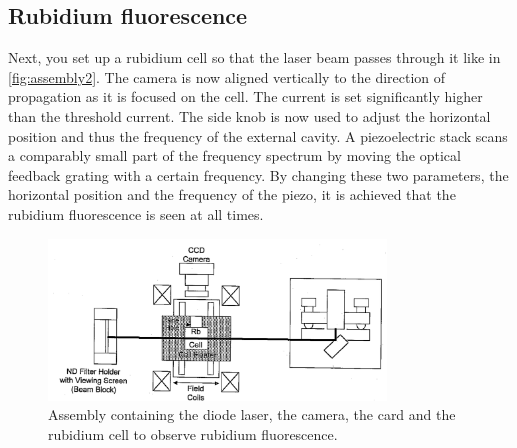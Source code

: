 \FloatBarrier

\subsection{Rubidium fluorescence}
Next, you set up a rubidium cell so that the laser beam passes through it like in \autoref{fig:assembly2}.
The camera is now aligned vertically to the direction of propagation as it is focused on the cell.
The current is set significantly higher than the threshold current.
The side knob is now used to adjust the horizontal position and thus the frequency of the external cavity.
A piezoelectric stack scans a comparably small part of the frequency spectrum by moving the optical feedback grating with a certain frequency.
By changing these two parameters, the horizontal position and the frequency of the piezo, it is achieved that the rubidium fluorescence is seen at all times.
\begin{figure}
    \center
    \includegraphics[width=0.8\textwidth]{bilder/Assembly_2.png}
    \caption{Assembly containing the diode laser, the camera, the card and the rubidium cell to observe rubidium fluorescence. \cite{anleitung}}
    \label{fig:assembly2}
\end{figure}

\FloatBarrier

